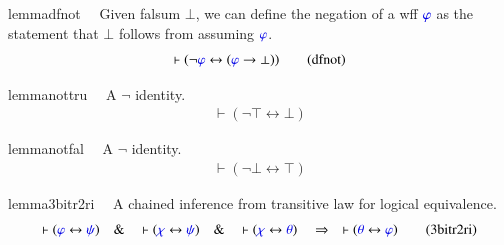 \begin{restatable}{lemma}{dfnot}~~ Given falsum $\bot$, we can define the
negation of a wff $\mw{\varphi}$ as the
     statement that $\bot$ follows from assuming $\mw{\varphi}$.  
\begin{align}
\vdash ( \lnot \mw{\varphi} \leftrightarrow ( \mw{\varphi} \rightarrow \bot )
    )\label{eq:dfnot}\tag{dfnot}
\end{align}
\end{restatable}

\begin{restatable}{lemma}{nottru}~~ A $\lnot$ identity.  ~
\begin{align}
\vdash ( \lnot \top \leftrightarrow \bot )\label{eq:nottru}\tag{nottru}
\end{align}
\end{restatable}

\begin{restatable}{lemma}{notfal}~~ A $\lnot$ identity.  ~
\begin{align}
\vdash ( \lnot \bot \leftrightarrow \top )\label{eq:notfal}\tag{notfal}
\end{align}
\end{restatable}

\begin{restatable}{lemma}{3bitr2ri}~~ A chained inference from transitive law
for logical equivalence.
       ~
\begin{align}
\vdash ( \mw{\varphi} \leftrightarrow \mw{\psi} )\quad\&\quad \vdash (
    \mw{\chi} \leftrightarrow \mw{\psi} )\quad\&\quad \vdash ( \mw{\chi}
    \leftrightarrow \mw{\theta} )\quad\Rightarrow\quad \vdash ( \mw{\theta}
    \leftrightarrow \mw{\varphi} )\label{eq:3bitr2ri}\tag{3bitr2ri}
\end{align}
\end{restatable}

